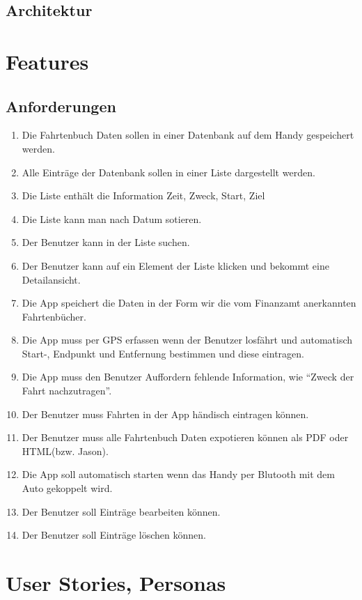 \documentclass[a4paper]{article}
\begin{document}
\subsection{Architektur}

\section{Features}

\subsection{Anforderungen}

\begin{enumerate}
	\item Die Fahrtenbuch Daten sollen in einer Datenbank auf dem Handy gespeichert werden.
	\item Alle Einträge der Datenbank sollen in einer Liste dargestellt werden.
	\item Die Liste enthält die Information Zeit, Zweck, Start, Ziel
	\item Die Liste kann man nach Datum sotieren.
	\item Der Benutzer kann in der Liste suchen.
	\item Der Benutzer kann auf ein Element der Liste klicken und bekommt eine Detailansicht.
	\item Die App speichert die Daten in der Form wir die vom Finanzamt anerkannten Fahrtenbücher.
	\item Die App muss per GPS erfassen wenn der Benutzer losfährt und automatisch Start-, Endpunkt und Entfernung bestimmen und diese eintragen.
	\item Die App muss den Benutzer Auffordern fehlende Information, wie \enquote{Zweck der Fahrt nachzutragen}.
	\item Der Benutzer muss Fahrten in der App händisch eintragen können.
	\item Der Benutzer muss alle Fahrtenbuch Daten expotieren können als PDF oder HTML(bzw. Jason).
	\item Die App soll automatisch starten wenn das Handy per Blutooth mit dem Auto gekoppelt wird.
	\item Der Benutzer soll Einträge bearbeiten können.
	\item Der Benutzer soll Einträge löschen können.
\end{enumerate}

\section{User Stories, Personas}
\end{document}
